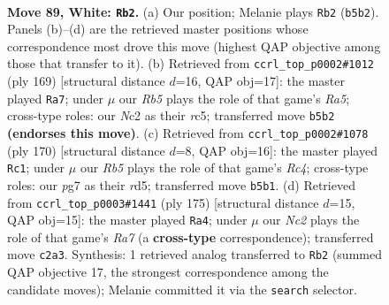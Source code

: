 \documentclass[11pt]{article}
\begin{document}
\clearpage

\begin{figure}[p]\centering
\begin{subfigure}{0.46\textwidth}\centering
\resizebox{\linewidth}{!}{%
\newchessgame
\chessboard[
  setfen={8/3r2p1/5p2/1R5p/4k2P/6P1/2N5/7K w - - 2 89},
  showmover=false,
  pgfstyle=straightmove, color=movearrow, markmove={b5-b2}
]}
\caption{}
\end{subfigure}\hfill
\begin{subfigure}{0.46\textwidth}\centering
\resizebox{\linewidth}{!}{%
\newchessgame
\chessboard[
  setfen={6k1/8/6p1/2R1K1Pp/r4P1P/8/8/8 b - - 4 85},
  showmover=false,
  pgfstyle=straightmove, color=movearrow, markmove={a4-a7}
]}
\caption{}
\end{subfigure}
\\[4pt]
\begin{subfigure}{0.46\textwidth}\centering
\resizebox{\linewidth}{!}{%
\newchessgame
\chessboard[
  setfen={8/1k5K/8/3r3p/2R3pP/6P1/8/8 w - - 18 86},
  showmover=false,
  pgfstyle=straightmove, color=movearrow, markmove={c4-c1}
]}
\caption{}
\end{subfigure}\hfill
\begin{subfigure}{0.46\textwidth}\centering
\resizebox{\linewidth}{!}{%
\newchessgame
\chessboard[
  setfen={8/5k2/2R3p1/7p/7P/4KPP1/r7/8 b - - 24 88},
  showmover=false,
  pgfstyle=straightmove, color=movearrow, markmove={a2-a4}
]}
\caption{}
\end{subfigure}
\caption{\textbf{Move 89, White: \texttt{Rb2}.} (a) Our position; Melanie plays \texttt{Rb2} (\texttt{b5b2}). Panels (b)--(d) are the retrieved master positions whose correspondence most drove this move (highest QAP objective among those that transfer to it). (b) Retrieved from \texttt{ccrl\_top\_p0002\#1012} (ply 169) [structural distance $d$=16, QAP obj=17]: the master played \texttt{Ra7}; under $\mu$ our \emph{Rb5} plays the role of that game's \emph{Ra5}; cross-type roles: our \emph{N}c2 as their \emph{r}c5; transferred move \texttt{b5b2} \textbf{(endorses this move)}. (c) Retrieved from \texttt{ccrl\_top\_p0002\#1078} (ply 170) [structural distance $d$=8, QAP obj=16]: the master played \texttt{Rc1}; under $\mu$ our \emph{Rb5} plays the role of that game's \emph{Rc4}; cross-type roles: our \emph{p}g7 as their \emph{r}d5; transferred move \texttt{b5b1}. (d) Retrieved from \texttt{ccrl\_top\_p0003\#1441} (ply 175) [structural distance $d$=15, QAP obj=15]: the master played \texttt{Ra4}; under $\mu$ our \emph{Nc2} plays the role of that game's \emph{Ra7} (a \textbf{cross-type} correspondence); transferred move \texttt{c2a3}. Synthesis: 1 retrieved analog transferred to \texttt{Rb2} (summed QAP objective 17, the strongest correspondence among the candidate moves); Melanie committed it via the \texttt{search} selector.}
\label{fig:thought-m176}
\end{figure}
\end{document}
